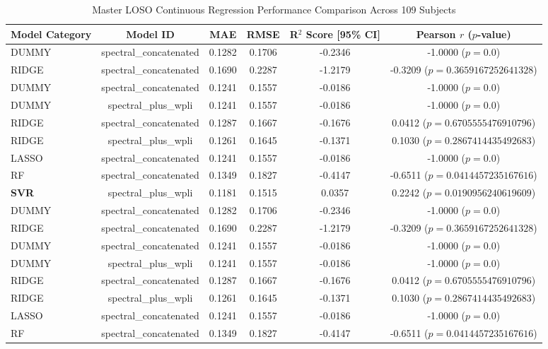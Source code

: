 \begin{table}[t]
\centering
\caption{Master LOSO Continuous Regression Performance Comparison Across 109 Subjects}
\label{tab:loso_master_comparison}
\begin{tabular}{lccccc}
\hline
\textbf{Model Category} & \textbf{Model ID} & \textbf{MAE} & \textbf{RMSE} & \textbf{R$^2$ Score [95\% CI]} & \textbf{Pearson $r$ ($p$-value)} \\
\hline
  DUMMY & spectral_concatenated & 0.1282 & 0.1706 & -0.2346 & -1.0000 ($p=0.0$) \\
  RIDGE & spectral_concatenated & 0.1690 & 0.2287 & -1.2179 & -0.3209 ($p=0.3659167252641328$) \\
  DUMMY & spectral_concatenated & 0.1241 & 0.1557 & -0.0186 & -1.0000 ($p=0.0$) \\
  DUMMY & spectral_plus_wpli & 0.1241 & 0.1557 & -0.0186 & -1.0000 ($p=0.0$) \\
  RIDGE & spectral_concatenated & 0.1287 & 0.1667 & -0.1676 & 0.0412 ($p=0.6705555476910796$) \\
  RIDGE & spectral_plus_wpli & 0.1261 & 0.1645 & -0.1371 & 0.1030 ($p=0.2867414435492683$) \\
  LASSO & spectral_concatenated & 0.1241 & 0.1557 & -0.0186 & -1.0000 ($p=0.0$) \\
  RF & spectral_concatenated & 0.1349 & 0.1827 & -0.4147 & -0.6511 ($p=0.0414457235167616$) \\
  \textbf{SVR} & spectral_plus_wpli & 0.1181 & 0.1515 & 0.0357 & 0.2242 ($p=0.0190956240619609$) \\
  DUMMY & spectral_concatenated & 0.1282 & 0.1706 & -0.2346 & -1.0000 ($p=0.0$) \\
  RIDGE & spectral_concatenated & 0.1690 & 0.2287 & -1.2179 & -0.3209 ($p=0.3659167252641328$) \\
  DUMMY & spectral_concatenated & 0.1241 & 0.1557 & -0.0186 & -1.0000 ($p=0.0$) \\
  DUMMY & spectral_plus_wpli & 0.1241 & 0.1557 & -0.0186 & -1.0000 ($p=0.0$) \\
  RIDGE & spectral_concatenated & 0.1287 & 0.1667 & -0.1676 & 0.0412 ($p=0.6705555476910796$) \\
  RIDGE & spectral_plus_wpli & 0.1261 & 0.1645 & -0.1371 & 0.1030 ($p=0.2867414435492683$) \\
  LASSO & spectral_concatenated & 0.1241 & 0.1557 & -0.0186 & -1.0000 ($p=0.0$) \\
  RF & spectral_concatenated & 0.1349 & 0.1827 & -0.4147 & -0.6511 ($p=0.0414457235167616$) \\

\end{tabular}
\end{table}
